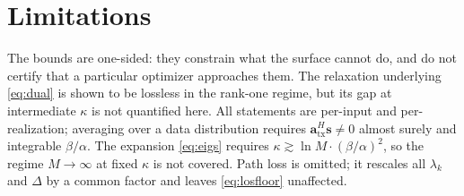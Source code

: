 \documentclass[11pt]{article}
\theoremstyle{remark}
\begin{document}
\section{Limitations}

The bounds are one-sided: they constrain what the surface cannot do, and do not
certify that a particular optimizer approaches them. The relaxation underlying
\eqref{eq:dual} is shown to be lossless in the rank-one regime, but its gap at
intermediate $\kappa$ is not quantified here. All statements are per-input and
per-realization; averaging over a data distribution requires
$\mathbf{a}_{\mathrm{tx}}^{H}\mathbf{s}\neq0$ almost surely and integrable
$\beta/\alpha$. The expansion \eqref{eq:eigs} requires
$\kappa\gtrsim\ln M\cdot(\beta/\alpha)^2$, so the regime $M\to\infty$ at fixed
$\kappa$ is not covered. Path loss is omitted; it rescales all $\lambda_k$ and
$\Delta$ by a common factor and leaves \eqref{eq:losfloor} unaffected.

\end{document}
